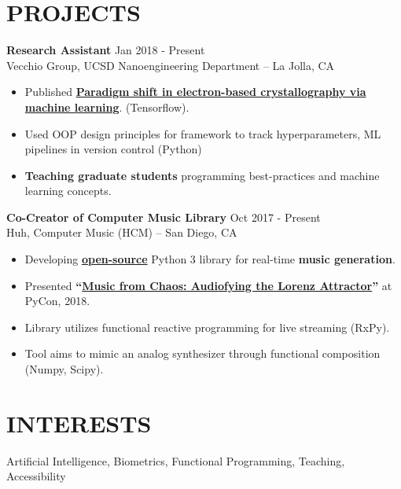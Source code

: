 \documentclass[line,mm]{res}
\begin{document}
\section{PROJECTS}
{\bf Research Assistant } \hfill            Jan 2018 - Present \\
  Vecchio Group, UCSD Nanoengineering Department -- La Jolla, CA
  \begin{itemize}  \itemsep -2pt %
     \item Published \href{https://arxiv.org/ftp/arxiv/papers/1902/1902.03682.pdf}{{\bf Paradigm shift in electron-based crystallography via machine learning}}. (Tensorflow). 
     \item Used OOP design principles for framework to track hyperparameters, ML pipelines in version control (Python)
     \item {\bf Teaching graduate students} programming best-practices and machine learning concepts.  
  \end{itemize} 


{\bf Co-Creator of Computer Music Library} \hfill 	 Oct 2017 - Present  \\
  Huh, Computer Music (HCM) -- San Diego, CA
  \begin{itemize}  \itemsep -2pt %
    \item Developing \href{https://github.com/alxrsngrtn/huh-computer-music}{{\bf open-source}} Python 3 library for real-time {\bf music generation}.  
    \item Presented {\bf ``\href{https://youtu.be/bTAFl8P2DkE?t=28m47s}{Music from Chaos: Audiofying the Lorenz Attractor}''} at PyCon, 2018.
    \item Library utilizes functional reactive programming for live streaming (RxPy).
    \item Tool aims to mimic an analog synthesizer through functional composition (Numpy, Scipy).
  \end{itemize}

\section{INTERESTS}
Artificial Intelligence, Biometrics, Functional Programming, Teaching, Accessibility
                 
\end{document}
